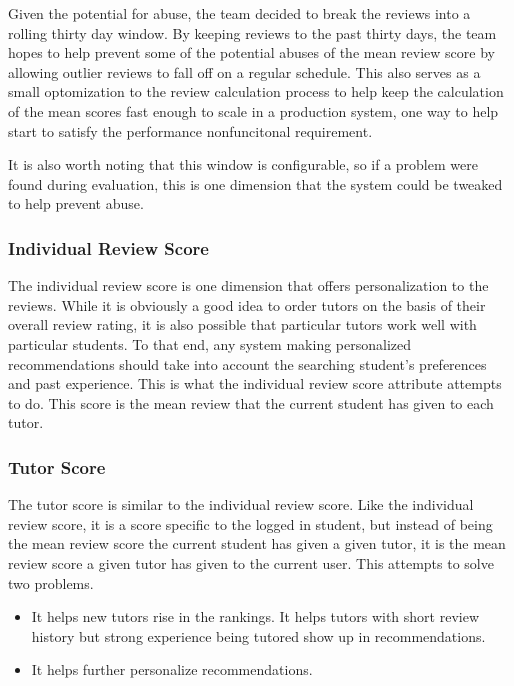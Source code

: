Given the potential for abuse, the team decided to break the reviews into a
rolling thirty day window. By keeping reviews to the past thirty days, the team
hopes to help prevent some of the potential abuses of the mean review score by
allowing outlier reviews to fall off on a regular schedule. This also serves as
a small optomization to the review calculation process to help keep the
calculation of the mean scores fast enough to scale in a production system, one
way to help start to satisfy the performance nonfuncitonal requirement.

It is also worth noting that this window is configurable, so if a problem were
found during evaluation, this is one dimension that the system could be
tweaked to help prevent abuse.

\subsubsection{Individual Review Score}
The individual review score is one dimension that offers personalization to
the reviews.  While it is obviously a good idea to order tutors on the basis
of their overall review rating, it is also possible that particular tutors
work well with particular students.  To that end, any system making
personalized recommendations should take into account the searching student's
preferences and past experience.  This is what the individual review score
attribute attempts to do.  This score is the mean review that the current
student has given to each tutor.  

\subsubsection{Tutor Score} %

The tutor score is similar to the individual review score.  Like the
individual review score, it is a score specific to the logged in student, but
instead of being the mean review score the current student has given a given
tutor, it is the mean review score a given tutor has given to the current
user.  This attempts to solve two problems.

\begin{itemize}
\item It helps new tutors rise in the rankings.
  It helps tutors with short review history but strong experience being
  tutored show up in recommendations.
\item It helps further personalize recommendations.
\end{itemize}

